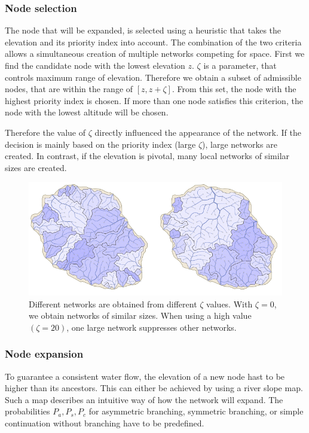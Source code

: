 \subsubsection{Node selection}
The node that will be expanded, is selected using a heuristic that takes the elevation and its priority index into account. The combination of the two criteria allows a simultaneous creation of multiple networks competing for space. 
First we find the candidate node with the lowest elevation $z$. 
$\zeta $ is a parameter, that controls maximum range of elevation. Therefore we obtain a subset of admissible nodes, that are within the range of $[z, z + \zeta]$. From this set, the node with the highest priority index is chosen. If more than one node satisfies this criterion, the node with the lowest altitude will be chosen. 

Therefore the value of $\zeta$ directly influenced the appearance of the network. If the decision is mainly based on the priority index (large $\zeta$), large networks are created. In contrast, if the elevation is pivotal, many local networks of similar sizes are created.

\begin{figure}[htb]
	\centering
	\includegraphics[width=\linewidth]{GGG13/drainage_system}
	\caption{Different networks are obtained from different $\zeta$ values. With $\zeta = 0$, we obtain networks of similar sizes. When using a high value $(\zeta = 20)$, one large network suppresses other networks. }
	\label{fig:dif_networks}
\end{figure}

\subsubsection{Node expansion}
To guarantee a consistent water flow, the elevation of a new node hast to be higher than its ancestors. This can either be achieved by using a river slope map. Such a map describes an intuitive way of how the network will expand. The probabilities $P_a, P_s, P_c$ for asymmetric branching, symmetric branching, or simple continuation without branching have to be predefined. 

